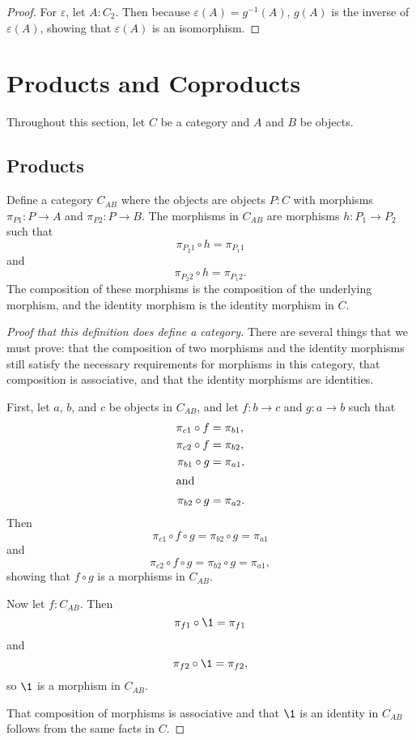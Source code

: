 \documentclass[../../math.tex]{subfiles}
\begin{document}
\begin{proof}
    For $\varepsilon$, let $A : C_2$.  Then because $\varepsilon(A) =
    g^{-1}(A)$, $g(A)$ is the inverse of $\varepsilon(A)$, showing that
    $\varepsilon(A)$ is an isomorphism.
\end{proof}

\section{Products and Coproducts}

Throughout this section, let $C$ be a category and $A$ and $B$ be objects.

\subsection{Products}

\begin{definition}
    Define a category $C_{AB}$ where the objects are objects $P : C$ with
    morphisms $\pi_{P1} : P \to A$ and $\pi_{P2} : P \to B$.  The morphisms in
    $C_{AB}$ are morphisms $h : P_1 \to P_2$ such that
    \[
        \pi_{P_2 1} \circ h = \pi_{P_1 1}
    \]
    and
    \[
        \pi_{P_2 2} \circ h = \pi_{P_1 2}.
    \]
    The composition of these morphisms is the composition of the underlying
    morphism, and the identity morphism is the identity morphism in $C$.
\end{definition}
\begin{proof}[Proof that this definition does define a category]
    There are several things that we must prove: that the composition of two
    morphisms and the identity morphisms still satisfy the necessary
    requirements for morphisms in this category, that composition is
    associative, and that the identity morphisms are identities.

    First, let $a$, $b$, and $c$ be objects in $C_{AB}$, and let $f : b \to c$
    and $g : a \to b$ such that
    \begin{align*}
        \pi_{c1} \circ f &= \pi_{b1}, \\
        \pi_{c2} \circ f &= \pi_{b2}, \\
        \pi_{b1} \circ g &= \pi_{a1}, \\
    \intertext{and}
        \pi_{b2} \circ g &= \pi_{a2}.
    \end{align*}
    Then
    \[
        \pi_{c1} \circ f \circ g = \pi_{b2} \circ g = \pi_{a1}
    \]
    and
    \[
        \pi_{c2} \circ f \circ g = \pi_{b2} \circ g = \pi_{a1},
    \]
    showing that $f \circ g$ is a morphisms in $C_{AB}$.

    Now let $f : C_{AB}$.  Then
    \[
        \pi_{f1} \circ \1 = \pi_{f1}
    \]
    and
    \[
        \pi_{f2} \circ \1 = \pi_{f2},
    \]
    so $\1$ is a morphism in $C_{AB}$.

    That composition of morphisms is associative and that $\1$ is an identity in
    $C_{AB}$ follows from the same facts in $C$.
\end{proof}
\end{document}
